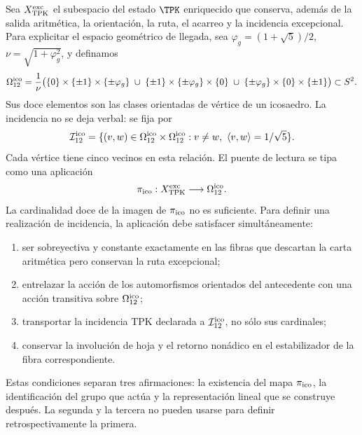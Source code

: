 Sea \(X_{\rm TPK}^{\rm exc}\) el subespacio del estado \(\TPK\) enriquecido
que conserva, adem\'as de la salida aritm\'etica, la orientaci\'on, la ruta,
el acarreo y la incidencia excepcional. Para explicitar el espacio geom\'etrico de llegada,
sea \(\varphi_g=(1+\sqrt5)/2\), \(\nu=\sqrt{1+\varphi_g^2}\), y definamos
\begin{equation}
\label{rm:eq:gravity-icosahedron-vertices}
\Omega_{12}^{\rm ico}
=\frac1\nu\bigl(
\{0\}\times\{\pm1\}\times\{\pm\varphi_g\}
\;\cup\;
\{\pm1\}\times\{\pm\varphi_g\}\times\{0\}
\;\cup\;
\{\pm\varphi_g\}\times\{0\}\times\{\pm1\}
\bigr)\subset S^2.
\end{equation}
Sus doce elementos son las clases orientadas de v\'ertice de un icosaedro.
La incidencia no se deja verbal: se fija por
\begin{equation}
\label{rm:eq:gravity-icosahedron-incidence}
\mathcal I_{12}^{\rm ico}
=\{(v,w)\in\Omega_{12}^{\rm ico}\times\Omega_{12}^{\rm ico}:
v\neq w,\ \langle v,w\rangle=1/\sqrt5\}.
\end{equation}
Cada v\'ertice tiene cinco vecinos en esta relaci\'on. El puente de lectura
se tipa como una aplicaci\'on
\begin{equation}
\label{rm:eq:gravity-exceptional-reader-map}
\pi_{\rm ico}:X_{\rm TPK}^{\rm exc}\longrightarrow\Omega_{12}^{\rm ico}.
\end{equation}
La cardinalidad doce de la imagen de \(\pi_{\rm ico}\) no es suficiente.
Para definir una realizaci\'on de incidencia, la aplicaci\'on debe satisfacer
simult\'aneamente:
\begin{enumerate}[label=(\roman*)]
\item ser sobreyectiva y constante exactamente en las fibras que descartan
la carta aritm\'etica pero conservan la ruta excepcional;
\item entrelazar la acci\'on de los automorfismos orientados del antecedente
con una acci\'on transitiva sobre \(\Omega_{12}^{\rm ico}\);
\item transportar la incidencia TPK declarada a
\(\mathcal I_{12}^{\rm ico}\), no
s\'olo sus cardinales;
\item conservar la involuci\'on de hoja y el retorno non\'adico en el
estabilizador de la fibra correspondiente.
\end{enumerate}

Estas condiciones separan tres afirmaciones: la existencia del mapa
\(\pi_{\rm ico}\), la identificaci\'on del grupo que act\'ua y la
representaci\'on lineal que se construye despu\'es. La segunda y la tercera
no pueden usarse para definir retrospectivamente la primera.

